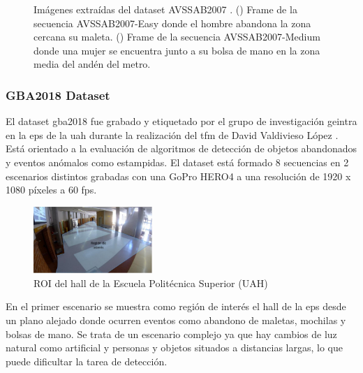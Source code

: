 \begin{figure}[ht]
\begin{subfigure}[b]{0.4\textwidth}
    \caption{}
    \label{fig:avssab2007_2}
  \end{subfigure}
  \caption{Imágenes extraídas del dataset AVSSAB2007 \cite{AVSSAB2007-dataset}.
    (\protect{}) Frame de la secuencia AVSSAB2007-Easy donde el hombre abandona la zona cercana su maleta.
    (\protect{}) Frame de la secuencia AVSSAB2007-Medium donde una mujer se encuentra junto a su bolsa de mano en la zona media del andén del metro.}
  \label{fig:avssab2007_near_medium}
\end{figure}

\subsubsection{GBA2018 Dataset}

El dataset \gls{gba2018} fue grabado y etiquetado por el grupo de investigación \gls{geintra} en la \gls{eps} de la \gls{uah} durante la realización del \gls{tfm} de David Valdivieso López \cite{valdivieso2018}. Está orientado a la evaluación de algoritmos de detección de objetos abandonados y eventos anómalos como estampidas. El dataset está formado 8 secuencias en 2 escenarios distintos grabadas con una GoPro HERO4 a una resolución de 1920 x 1080 píxeles a 60 \gls{fps}.

\begin{figure}[ht]
\centering
\includegraphics[width=0.4\textwidth]{img/chapters/resultados/datasets/hall-eps.jpg}
\caption{\label{fig:roi-hall-eps}ROI del hall de la Escuela Politécnica Superior (UAH)}
\end{figure}

En el primer escenario se muestra como región de interés el hall de la \gls{eps} desde un plano alejado donde ocurren eventos como abandono de maletas, mochilas y bolsas de mano. Se trata de un escenario complejo ya que hay cambios de luz natural como artificial y personas y objetos situados a distancias largas, lo que puede dificultar la tarea de detección.

